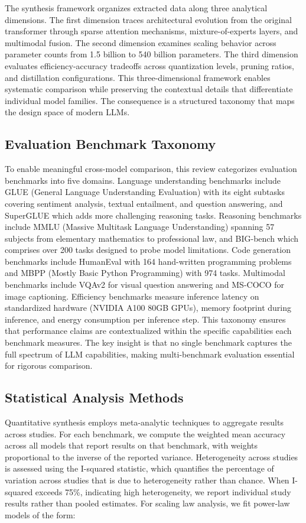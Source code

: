 \documentclass[journal]{IEEEtran}
\begin{document}
The synthesis framework organizes extracted data along three analytical dimensions. The first dimension traces architectural evolution from the original transformer through sparse attention mechanisms, mixture-of-experts layers, and multimodal fusion. The second dimension examines scaling behavior across parameter counts from 1.5 billion to 540 billion parameters. The third dimension evaluates efficiency-accuracy tradeoffs across quantization levels, pruning ratios, and distillation configurations. This three-dimensional framework enables systematic comparison while preserving the contextual details that differentiate individual model families. The consequence is a structured taxonomy that maps the design space of modern LLMs.

\subsection{Evaluation Benchmark Taxonomy}

To enable meaningful cross-model comparison, this review categorizes evaluation benchmarks into five domains. Language understanding benchmarks include GLUE (General Language Understanding Evaluation) with its eight subtasks covering sentiment analysis, textual entailment, and question answering, and SuperGLUE which adds more challenging reasoning tasks. Reasoning benchmarks include MMLU (Massive Multitask Language Understanding) spanning 57 subjects from elementary mathematics to professional law, and BIG-bench which comprises over 200 tasks designed to probe model limitations. Code generation benchmarks include HumanEval with 164 hand-written programming problems and MBPP (Mostly Basic Python Programming) with 974 tasks. Multimodal benchmarks include VQAv2 for visual question answering and MS-COCO for image captioning. Efficiency benchmarks measure inference latency on standardized hardware (NVIDIA A100 80GB GPUs), memory footprint during inference, and energy consumption per inference step. This taxonomy ensures that performance claims are contextualized within the specific capabilities each benchmark measures. The key insight is that no single benchmark captures the full spectrum of LLM capabilities, making multi-benchmark evaluation essential for rigorous comparison.

\subsection{Statistical Analysis Methods}

Quantitative synthesis employs meta-analytic techniques to aggregate results across studies. For each benchmark, we compute the weighted mean accuracy across all models that report results on that benchmark, with weights proportional to the inverse of the reported variance. Heterogeneity across studies is assessed using the I-squared statistic, which quantifies the percentage of variation across studies that is due to heterogeneity rather than chance. When I-squared exceeds 75\%, indicating high heterogeneity, we report individual study results rather than pooled estimates. For scaling law analysis, we fit power-law models of the form:
\end{document}
